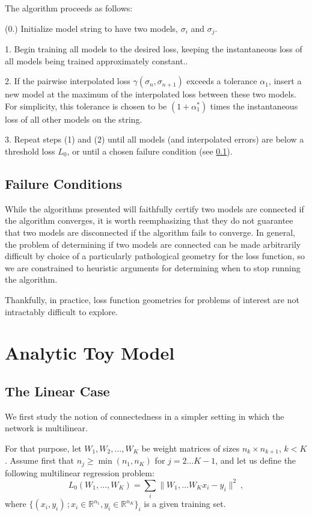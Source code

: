 \documentclass[twocolumn,superscriptaddress,aps,prb,floatfix]{revtex4-1}
\begin{document}
  The algorithm proceeds as follows:
  
  (0.) Initialize model string to have two models, $\sigma_i$ and $\sigma_j$.
  
  1. Begin training all models to the desired loss, keeping the instantaneous loss of all models being trained approximately constant..
  
  2. If the pairwise interpolated loss $\gamma(\sigma_n,\sigma_{n+1})$ exceeds a tolerance $\alpha_1$, insert a new model at the maximum of the interpolated loss between these two models.  For simplicity, this tolerance is chosen to be $(1 + \alpha_1^*)$ times the instantaneous loss of all other models on the string.  
  
  3. Repeat steps (1) and (2) until all models (and interpolated errors) are below a threshold loss $L_0$, or until a chosen failure condition (see \ref{sec:Fail}).
  
  \subsection{Failure Conditions}
  \label{sec:Fail}
  
  While the algorithms presented will faithfully certify two models are connected if the algorithm converges, it is worth reemphasizing that they do not guarantee that two models are disconnected if the algorithm fails to converge.  In general, the problem of determining if two models are connected can be made arbitrarily difficult by choice of a particularly pathological geometry for the loss function, so we are constrained to heuristic arguments for determining when to stop running the algorithm.
  
  Thankfully, in practice, loss function geometries for problems of interest are not intractably difficult to explore.
 

\section{Analytic Toy Model}
\label{sec:ToyModel}

\subsection{The Linear Case}

We first study the notion of connectedness in a simpler setting in which the 
network is multilinear. 

For that purpose, let $W_1, W_2, \dots, W_K$ be weight matrices of sizes 
$n_k \times n_{k+1}$, $k < K$. Assume first that $n_j \geq \min(n_1, n_K)$ for $j=2 \dots K-1$, 
and let us define the following multilinear regression problem:
\begin{equation}
\label{multilinloss}
L_0(W_1, \dots, W_K) = \sum_i \| W_1, \dots W_K x_i - y_i \|^2~,
\end{equation}
where $\{ (x_i, y_i)\,; x_i \in \mathbb{R}^{n_1}, y_i \in \mathbb{R}^{n_K} \}_i$ is a given 
training set. 
\end{document}

